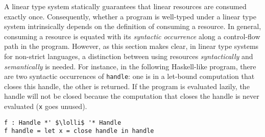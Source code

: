 \documentclass[acmsmall,review,anonymous,screen]{acmart}
\newcommand{\lolli}{\multimap}
\begin{document}
A linear type system statically guarantees that linear resources are
consumed exactly once. Consequently, whether a program is
well-typed under a linear type system intrinsically depends on the
definition of consuming a resource.
In general, consuming a resource is equated with its 
\emph{syntactic occurrence} along a control-flow path in the program. However, as this section
makes clear, in linear type systems for non-strict
languages, a distinction between using
resources \emph{syntactically} and \emph{semantically} is needed.
%
For instance, in the following Haskell-like program, there are two syntactic
occurrences of \lstinline{handle}: one is in a let-bound computation that
closes this handle, the other is returned. If the program is evaluated lazily,
the handle will not be closed because the computation that closes the handle is
never evaluated (\lstinline{x} goes unused).
%
\begin{lstlisting}
f : Handle *' $\lolli$ '* Handle
f handle = let x = close handle in handle
\end{lstlisting}
%
%
%
%
%
%
%
%
%
%
\end{document}
